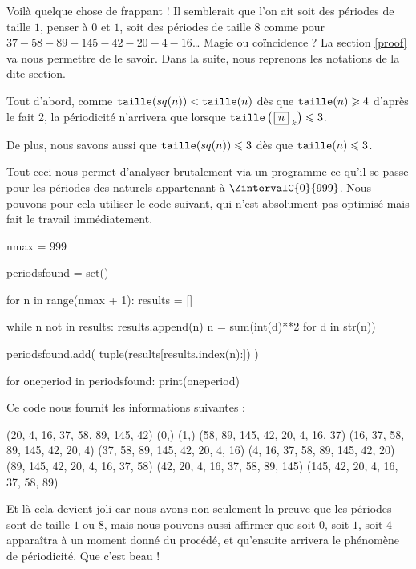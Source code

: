 \medskip

Voilà quelque chose de frappant ! Il semblerait que l'on ait soit des périodes de taille $1$, penser à $0$ et $1$, soit des périodes de taille $8$ comme pour $37 - 58 - 89 - 145 - 42 - 20 - 4 - 16$\dots{}
Magie ou coïncidence ? La section \ref{proof} va nous permettre de le savoir. Dans la suite, nous reprenons les notations de la dite section.


\medskip

Tout d'abord, comme $\operatorname{\text{\normalfont\texttt{taille}}}(sq(n)) < \operatorname{\text{\normalfont\texttt{taille}}}(n)$ dès que $\operatorname{\text{\normalfont\texttt{taille}}}(n) \geqslant 4$ d'après le fait 2, la périodicité n'arrivera que lorsque $\operatorname{\text{\normalfont\texttt{taille}}}\left( \, \fbox{$n$}_{\,\,k} \right) \leqslant 3$.


\medskip

De plus, nous savons aussi que $\operatorname{\text{\normalfont\texttt{taille}}}(sq(n)) \leqslant 3$ dès que $\operatorname{\text{\normalfont\texttt{taille}}}(n) \leqslant 3$.


\medskip

Tout ceci nous permet d'analyser brutalement via un programme ce qu'il se passe pour les périodes des naturels appartenant à $\ZintervalC{0}{999}$. Nous pouvons pour cela utiliser le code suivant, qui n'est absolument pas optimisé mais fait le travail immédiatement.


\newpage

\begin{rawcode}
nmax = 999

periodsfound = set()

for n in range(nmax + 1):
    results = []

    while n not in results:
        results.append(n)
        n = sum(int(d)**2 for d in str(n))

    periodsfound.add(
        tuple(results[results.index(n):])
    )

for oneperiod in periodsfound:
    print(oneperiod)
\end{rawcode}


\medskip

Ce code nous fournit les informations suivantes :

\begin{rawcode}
(20, 4, 16, 37, 58, 89, 145, 42)
(0,)
(1,)
(58, 89, 145, 42, 20, 4, 16, 37)
(16, 37, 58, 89, 145, 42, 20, 4)
(37, 58, 89, 145, 42, 20, 4, 16)
(4, 16, 37, 58, 89, 145, 42, 20)
(89, 145, 42, 20, 4, 16, 37, 58)
(42, 20, 4, 16, 37, 58, 89, 145)
(145, 42, 20, 4, 16, 37, 58, 89)
\end{rawcode}


\medskip

Et là cela devient joli car nous avons non seulement la preuve que les périodes sont de taille $1$ ou $8$, mais nous pouvons aussi affirmer que soit $0$, soit $1$, soit $4$ apparaîtra à un moment donné du procédé, et qu'ensuite arrivera le phénomène de périodicité. Que c'est beau !


